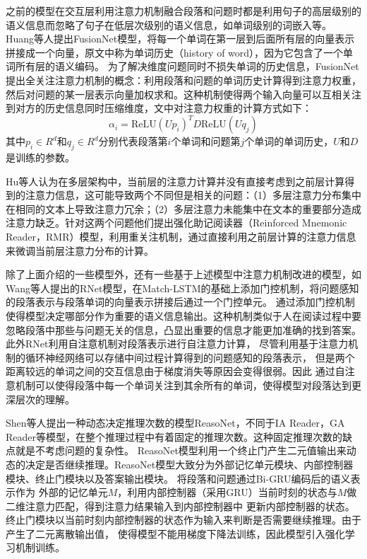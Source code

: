 \noindent 之前的模型在交互层利用注意力机制融合段落和问题时都是利用句子的高层级别的语义信息而忽略了句子在低层次级别的语义信息，如单词级别的词嵌入等。
Huang等人提出FusionNet模型，将每一个单词在第一层到后面所有层的向量表示拼接成一个向量，原文中称为单词历史（history of word），因为它包含了一个单词所有层的语义编码。
为了解决维度问题同时不损失单词的历史信息，FusionNet提出全关注注意力机制的概念：利用段落和问题的单词历史计算得到注意力权重，然后对问题的某一层表示向量加权求和。这种机制使得两个输入向量可以互相关注到对方的历史信息同时压缩维度，文中对注意力权重的计算方式如下：
\begin{equation}
\alpha_i=\text{ReLU}(Up_i)^TD\text{ReLU}(Uq_j)
\end{equation}
其中$p_i\in R^d$和$q_j\in R^d$分别代表段落第$i$个单词和问题第$j$个单词的单词历史，$U$和$D$是训练的参数。
%

\noindent Hu等人认为在多层架构中，当前层的注意力计算并没有直接考虑到之前层计算得到的注意力信息，这可能导致两个不同但是相关的问题：（1）多层注意力分布集中在相同的文本上导致注意力冗余；（2）多层注意力未能集中在文本的重要部分造成注意力缺乏。针对这两个问题他们提出强化助记阅读器（Reinforced Mnemonic Reader，RMR）模型，利用重关注机制，通过直接利用之前层计算的注意力信息来微调当前层注意力分布的计算。

除了上面介绍的一些模型外，还有一些基于上述模型中注意力机制改进的模型，如Wang等人提出的RNet模型，在Match-LSTM的基础上添加门控机制，将问题感知的段落表示与段落单词的向量表示拼接后通过一个门控单元。
通过添加门控机制使得模型决定哪部分作为重要的语义信息输出。这种机制类似于人在阅读过程中要
忽略段落中那些与问题无关的信息，凸显出重要的信息才能更加准确的找到答案。
此外RNet利用自注意机制对段落表示进行自注意力计算，
尽管利用基于注意力机制的循环神经网络可以存储中间过程计算得到的问题感知的段落表示，
但是两个距离较远的单词之间的交互信息由于梯度消失等原因会变得很弱。因此
通过自注意机制可以使得段落中每一个单词关注到其余所有的单词，使得模型对段落达到更深层次的理解。

Shen等人提出一种动态决定推理次数的模型ReasoNet，不同于IA Reader，GA Reader等模型，在整个推理过程中有着固定的推理次数。这种固定推理次数的缺点就是不考虑问题的复杂性。
ReasoNet模型利用一个终止门产生二元值输出来动态的决定是否继续推理。ReasoNet模型大致分为外部记忆单元模块、内部控制器模块、终止门模块以及答案输出模块。
将段落和问题通过Bi-GRU编码后的语义表示作为
外部的记忆单元$M$，利用内部控制器（采用GRU）当前时刻的状态与$M$做二维注意力匹配，得到注意力结果输入到内部控制器中
更新内部控制器的状态。终止门模块以当前时刻内部控制器的状态作为输入来判断是否需要继续推理。由于产生了二元离散输出值，
使得模型不能用梯度下降法训练，因此模型引入强化学习机制训练。

